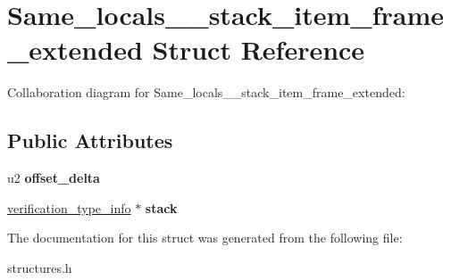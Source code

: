 \hypertarget{structSame__locals__1__stack__item__frame__extended}{}\section{Same\+\_\+locals\+\_\+\_\+stack\+\_\+item\+\_\+frame\+\_\+extended Struct Reference}
\label{structSame__locals__1__stack__item__frame__extended}


Collaboration diagram for Same\+\_\+locals\+\_\+\_\+stack\+\_\+item\+\_\+frame\+\_\+extended\+:
\subsection*{Public Attributes}
\begin{DoxyCompactItemize}
\item 
u2 {\bfseries offset\+\_\+delta}\hypertarget{structSame__locals__1__stack__item__frame__extended_af1fb0ce3ba68c6d6b49992b99a044235}{}\label{structSame__locals__1__stack__item__frame__extended_af1fb0ce3ba68c6d6b49992b99a044235}

\item 
\hyperlink{structverification__type__info}{verification\+\_\+type\+\_\+info} $\ast$ {\bfseries stack}\hypertarget{structSame__locals__1__stack__item__frame__extended_a7900584b7fadb413da796fbd30c1fa2b}{}\label{structSame__locals__1__stack__item__frame__extended_a7900584b7fadb413da796fbd30c1fa2b}

\end{DoxyCompactItemize}


The documentation for this struct was generated from the following file\+:\begin{DoxyCompactItemize}
\item 
structures.\+h\end{DoxyCompactItemize}
